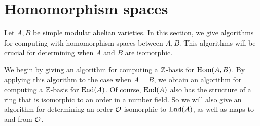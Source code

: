 


\section{Homomorphism spaces}

Let $A, B$ be simple modular abelian varieties. In this section, we give
algorithms for computing with homomorphism spaces between $A, B$. This
algorithms will be crucial for determining when $A$ and $B$ are isomorphic. 

We begin by giving an algorithm for computing a $\mathbb{Z}$-basis for $\operatorname{Hom}(A,B)$.
By applying this algorithm to the case when $A=B$, we obtain an algorithm for
computing a $\mathbb{Z}$-basis for $\operatorname{End}(A)$. Of course, $\operatorname{End}(A)$ also has the
structure of a ring that is isomorphic to an order in a number field. So we
will also give an algorithm for determining an order $\mathcal{O}$ isomorphic to
$\operatorname{End}(A)$, as well as maps to and from $\mathcal{O}$.

